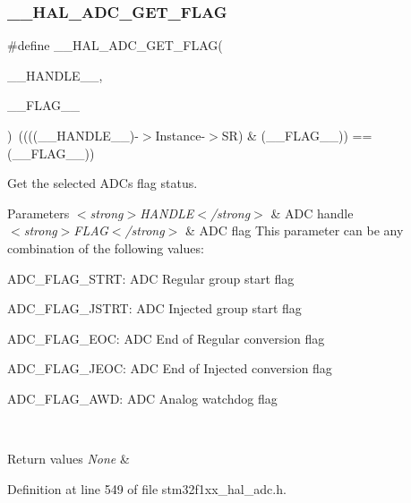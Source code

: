 \subsubsection{\texorpdfstring{\+\_\+\+\_\+\+H\+A\+L\+\_\+\+A\+D\+C\+\_\+\+G\+E\+T\+\_\+\+F\+L\+AG}{\_\_HAL\_ADC\_GET\_FLAG}}
{\footnotesize\ttfamily \#define \+\_\+\+\_\+\+H\+A\+L\+\_\+\+A\+D\+C\+\_\+\+G\+E\+T\+\_\+\+F\+L\+AG(\begin{DoxyParamCaption}\item[{}]{\+\_\+\+\_\+\+H\+A\+N\+D\+L\+E\+\_\+\+\_\+,  }\item[{}]{\+\_\+\+\_\+\+F\+L\+A\+G\+\_\+\+\_\+ }\end{DoxyParamCaption})~((((\+\_\+\+\_\+\+H\+A\+N\+D\+L\+E\+\_\+\+\_\+)-\/$>$Instance-\/$>$SR) \& (\+\_\+\+\_\+\+F\+L\+A\+G\+\_\+\+\_\+)) == (\+\_\+\+\_\+\+F\+L\+A\+G\+\_\+\+\_\+))}



Get the selected A\+DC\textquotesingle{}s flag status. 


\begin{DoxyParams}{Parameters}
{\em $<$strong$>$\+H\+A\+N\+D\+L\+E$<$/strong$>$} & A\+DC handle \\
\hline
{\em $<$strong$>$\+F\+L\+A\+G$<$/strong$>$} & A\+DC flag This parameter can be any combination of the following values\+: \begin{DoxyItemize}
\item A\+D\+C\+\_\+\+F\+L\+A\+G\+\_\+\+S\+T\+RT\+: A\+DC Regular group start flag \item A\+D\+C\+\_\+\+F\+L\+A\+G\+\_\+\+J\+S\+T\+RT\+: A\+DC Injected group start flag \item A\+D\+C\+\_\+\+F\+L\+A\+G\+\_\+\+E\+OC\+: A\+DC End of Regular conversion flag \item A\+D\+C\+\_\+\+F\+L\+A\+G\+\_\+\+J\+E\+OC\+: A\+DC End of Injected conversion flag \item A\+D\+C\+\_\+\+F\+L\+A\+G\+\_\+\+A\+WD\+: A\+DC Analog watchdog flag \end{DoxyItemize}
\\
\hline
\end{DoxyParams}

\begin{DoxyRetVals}{Return values}
{\em None} & \\
\hline
\end{DoxyRetVals}


Definition at line 549 of file stm32f1xx\+\_\+hal\+\_\+adc.\+h.

\mbox{\label{group___a_d_c___exported___macros_gaf29cd943cb451e4ed1f07bd7d4854fb0}} 
